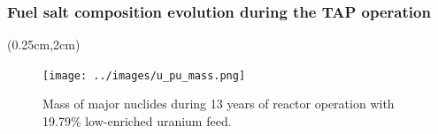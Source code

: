 \begin{frame}
\frametitle{Fuel salt composition evolution during the TAP operation}
\begin{textblock*}{12.25cm}(0.25cm,2cm) %
	\begin{figure}[htp!] %
		\centering
				\vspace{-3mm}
		\texttt{[image: ../images/u\_pu\_mass.png]}
		\caption{Mass of major nuclides during 13 years of reactor operation 
		with 19.79\% low-enriched uranium feed.}
	\end{figure}
\end{textblock*}
\end{frame}